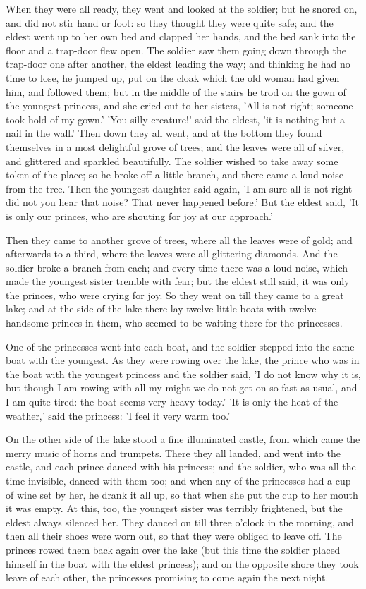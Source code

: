 \documentclass[12pt]{book}
\begin{document}
When they were all ready, they went and looked at the soldier; but he
snored on, and did not stir hand or foot: so they thought they were
quite safe; and the eldest went up to her own bed and clapped her
hands, and the bed sank into the floor and a trap-door flew open. The
soldier saw them going down through the trap-door one after another,
the eldest leading the way; and thinking he had no time to lose, he
jumped up, put on the cloak which the old woman had given him, and
followed them; but in the middle of the stairs he trod on the gown of
the youngest princess, and she cried out to her sisters, 'All is not
right; someone took hold of my gown.' 'You silly creature!' said the
eldest, 'it is nothing but a nail in the wall.' Then down they all
went, and at the bottom they found themselves in a most delightful
grove of trees; and the leaves were all of silver, and glittered and
sparkled beautifully. The soldier wished to take away some token of
the place; so he broke off a little branch, and there came a loud
noise from the tree. Then the youngest daughter said again, 'I am sure
all is not right--did not you hear that noise? That never happened
before.' But the eldest said, 'It is only our princes, who are
shouting for joy at our approach.'

Then they came to another grove of trees, where all the leaves were of
gold; and afterwards to a third, where the leaves were all glittering
diamonds. And the soldier broke a branch from each; and every time
there was a loud noise, which made the youngest sister tremble with
fear; but the eldest still said, it was only the princes, who were
crying for joy. So they went on till they came to a great lake; and at
the side of the lake there lay twelve little boats with twelve
handsome princes in them, who seemed to be waiting there for the
princesses.

One of the princesses went into each boat, and the soldier stepped
into the same boat with the youngest. As they were rowing over the
lake, the prince who was in the boat with the youngest princess and
the soldier said, 'I do not know why it is, but though I am rowing
with all my might we do not get on so fast as usual, and I am quite
tired: the boat seems very heavy today.' 'It is only the heat of the
weather,' said the princess: 'I feel it very warm too.'

On the other side of the lake stood a fine illuminated castle, from
which came the merry music of horns and trumpets. There they all
landed, and went into the castle, and each prince danced with his
princess; and the soldier, who was all the time invisible, danced with
them too; and when any of the princesses had a cup of wine set by her,
he drank it all up, so that when she put the cup to her mouth it was
empty. At this, too, the youngest sister was terribly frightened, but
the eldest always silenced her. They danced on till three o'clock in
the morning, and then all their shoes were worn out, so that they were
obliged to leave off. The princes rowed them back again over the lake
(but this time the soldier placed himself in the boat with the eldest
princess); and on the opposite shore they took leave of each other,
the princesses promising to come again the next night.
\end{document}
